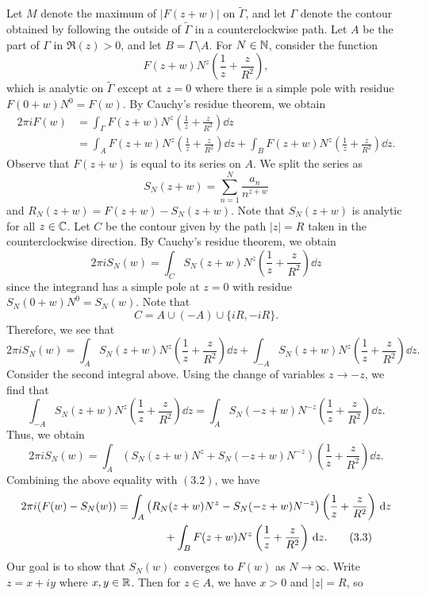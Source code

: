 \begin{pf}
Let $M$ denote the maximum of $|F(z+w)|$ on $\tilde \Gamma$, and let $\Gamma$ denote the contour 
obtained by following the outside of $\tilde\Gamma$ in a counterclockwise path. Let $A$ be the 
part of $\Gamma$ in $\Re(z) > 0$, and let $B = \Gamma \setminus A$. For $N \in \mathbb{N}$, consider the 
function 
\[ F(z+w)N^z \left( \frac1z + \frac z{R^2} \right), \]
which is analytic on $\tilde\Gamma$ except at $z = 0$ where there is a simple pole with residue 
$F(0+w) N^0 = F(w)$. By Cauchy's residue theorem, we obtain 
\begin{align*}
    2\pi i F(w) &= \int_\Gamma F(z+w) N^z \left( \frac1z + \frac z{R^2} \right)\dd z \\
    &= \int_A F(z+w) N^z \left( \frac1z + \frac z{R^2} \right)\dd z + 
    \int_B F(z+w) N^z \left( \frac1z + \frac z{R^2} \right)\dd z. \tag{3.2} 
\end{align*}
Observe that $F(z+w)$ is equal to its series on $A$. We split the series as 
\[ S_N(z+w) = \sum_{n=1}^N \frac{a_n}{n^{z+w}} \]
and $R_N(z+w) = F(z+w) - S_N(z+w)$. Note that $S_N(z+w)$ is analytic for all $z \in \mathbb{C}$. Let 
$C$ be the contour given by the path $|z| = R$ taken in the counterclockwise direction. 
By Cauchy's residue theorem, we obtain 
\[ 2\pi i S_N(w) = \int_C S_N(z+w) N^z \left( \frac1z + \frac z{R^2} \right)\dd z \]
since the integrand has a simple pole at $z = 0$ with residue $S_N(0+w) N^0 = S_N(w)$. Note that 
\[ C = A \cup (-A) \cup \{iR, -iR\}. \]
Therefore, we see that 
\[ 2\pi i S_N(w) = \int_A S_N(z+w) N^z \left( \frac1z + \frac z{R^2} \right)\dd z 
+ \int_{-A} S_N(z+w) N^z \left( \frac1z + \frac z{R^2} \right)\dd z. \]
Consider the second integral above. Using the change of variables $z \to -z$, we find that 
\[ \int_{-A} S_N(z+w) N^z \left( \frac1z + \frac z{R^2} \right)\dd z 
= \int_A S_N(-z+w) N^{-z} \left( \frac1z + \frac z{R^2} \right) \dd z. \]
Thus, we obtain 
\[ 2\pi i S_N(w) = \int_A \left( S_N(z+w) N^z + S_N(-z + w) N^{-z} \right) \left( \frac1z + \frac{z}{R^2} \right)\dd z. \]
Combining the above equality with $(3.2)$, we have 
\begin{align*}
    2\pi i(F(w) - S_N(w)) &= \int_A \left( R_N(z+w) N^z - S_N(-z+w) N^{-z} \right) \left( \frac1z + \frac z{R^2} \right) \,\mathrm{d} z\\ &\hspace{1.5cm} + \int_B F(z+w) N^z \left( \frac1z + \frac z{R^2} \right)\,\mathrm{d} z. \tag{3.3}
\end{align*}  
Our goal is to show that $S_N(w)$ converges to $F(w)$ as $N \to \infty$. Write $z = x + iy$
where $x, y \in \mathbb{R}$. Then for $z \in A$, we have $x > 0$ and $|z| = R$, so 

\end{pf}
